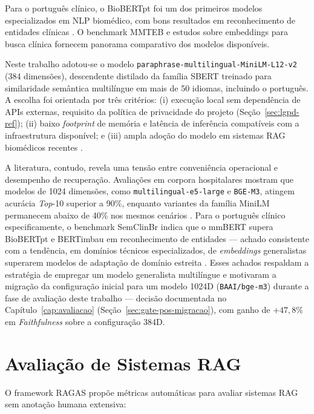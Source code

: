 \documentclass[
  12pt,
  oneside,
  a4paper,
  english,
  brazil
]{abntex2}
\begin{document}
Para o português clínico, o BioBERTpt \cite{biobertpt2020} foi um dos primeiros
modelos especializados em NLP biomédico, com bons resultados em reconhecimento de
entidades clínicas \cite{clinicalNERPortuguese2026}. O benchmark MMTEB
\cite{mmteb2025} e estudos sobre embeddings para busca clínica
\cite{generalistEmbeddingsClinical2024} fornecem panorama comparativo dos modelos
disponíveis.

Neste trabalho adotou-se o modelo \texttt{paraphrase-multilingual-MiniLM-L12-v2}
(384 dimensões), descendente distilado da família SBERT \cite{reimers2019} treinado
para similaridade semântica multilíngue em mais de 50 idiomas, incluindo o português.
A escolha foi orientada por três critérios: (i) execução local sem dependência de APIs
externas, requisito da política de privacidade do projeto (Seção~\ref{sec:lgpd-ref});
(ii) baixo \textit{footprint} de memória e latência de inferência compatíveis com a
infraestrutura disponível; e (iii) ampla adoção do modelo em sistemas RAG biomédicos
recentes \cite{ocaf2024}.

A literatura, contudo, revela uma tensão entre conveniência operacional e desempenho de
recuperação. Avaliações em corpora hospitalares mostram que modelos de 1024 dimensões,
como \texttt{multilingual-e5-large} e \texttt{BGE-M3}, atingem acurácia
\textit{Top}-10 superior a 90\%, enquanto variantes da família MiniLM permanecem abaixo
de 40\% nos mesmos cenários \cite{SHTI2023, mmteb2025}. Para o português clínico especificamente, o benchmark SemClinBr
\cite{clinicalNERPortuguese2026} indica que o mmBERT
\cite{marone2025mmbert} supera BioBERTpt e BERTimbau em reconhecimento
de entidades --- achado consistente com a tendência, em domínios
técnicos especializados, de \textit{embeddings} generalistas superarem
modelos de adaptação de domínio estreita
\cite{generalistEmbeddingsClinical2024}. Esses achados respaldam a estratégia de
empregar um modelo generalista multilíngue e motivaram a migração da configuração
inicial para um modelo 1024D (\texttt{BAAI/bge-m3}) durante a fase de avaliação
deste trabalho --- decisão documentada no Capítulo~\ref{cap:avaliacao}
(Seção~\ref{sec:gate-pos-migracao}), com ganho de $+47{,}8\%$ em
\textit{Faithfulness} sobre a configuração 384D.

\section{Avaliação de Sistemas RAG}

O framework RAGAS \cite{es2024} propõe métricas automáticas para avaliar
sistemas RAG sem anotação humana extensiva:
\end{document}
